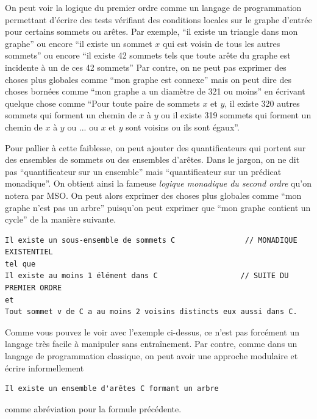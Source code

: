 \documentclass[a4paper,12pt]{article}
\theoremstyle{definition}
\theoremstyle{remark}
\begin{document}
On peut voir la logique du premier ordre comme un langage de
programmation permettant d'écrire des tests vérifiant 
des conditions locales sur le graphe d'entrée pour certains sommets ou
arêtes. Par exemple, ``il existe un triangle dans mon graphe'' ou
encore ``il existe un sommet $x$ qui est voisin de tous les autres
sommets'' ou encore ``il existe 42 sommets tels que toute arête du
graphe est incidente à un de ces 42 sommets''
Par contre, on ne peut pas exprimer des choses plus globales comme
``mon graphe est connexe'' mais on peut dire des choses bornées comme
``mon graphe a un diamètre de 321 ou moins'' en écrivant quelque chose comme
``Pour toute paire de sommets $x$ et $y$, il existe 320 autres sommets qui forment
un chemin de $x$ à $y$ ou il existe 319 sommets qui forment un chemin
de $x$ à $y$ ou ... ou $x$ et $y$ sont voisins ou ils sont égaux''.

Pour pallier à cette faiblesse, on peut ajouter des quantificateurs
qui portent sur des ensembles de sommets ou des ensembles
d'arêtes\footnotemark{}.
Dans le jargon, on ne dit pas ``quantificateur sur un ensemble'' mais
``quantificateur sur un prédicat monadique''. On obtient ainsi la
fameuse \emph{logique monadique du second ordre}\footnotemark{} qu'on notera par MSO.
On peut alors exprimer des choses plus globales comme ``mon graphe
n'est pas un arbre'' puisqu'on peut exprimer que ``mon graphe contient
un cycle'' de la manière suivante.

\begin{verbatim}
Il existe un sous-ensemble de sommets C                // MONADIQUE EXISTENTIEL
tel que
Il existe au moins 1 élément dans C                   // SUITE DU PREMIER ORDRE
et
Tout sommet v de C a au moins 2 voisins distincts eux aussi dans C.
\end{verbatim}

Comme vous pouvez le voir avec l'exemple ci-dessus, ce n'est pas
forcément un langage très facile à manipuler sans entraînement. Par
contre, comme dans un langage de programmation classique, on peut
avoir une approche modulaire et écrire informellement 
\begin{verbatim}
Il existe un ensemble d'arêtes C formant un arbre
\end{verbatim}
comme abréviation pour la formule précédente.
\end{document}
